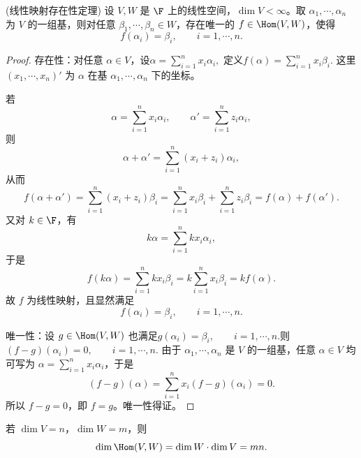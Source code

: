 \begin{theorem}(线性映射存在性定理)
	设 $V,W$ 是 $\F$ 上的线性空间，$\dim V<\infty$。取
	$\alpha_1,\cdots,\alpha_n$ 为 $V$ 的一组基，则对任意
	$\beta_1,\cdots,\beta_n\in W$，存在唯一的
	$f\in\Hom(V,W)$，使得
	\[
	f(\alpha_i)=\beta_i,
	\qquad i=1,\cdots,n.
	\]
\end{theorem}

\begin{proof}
	存在性：对任意 $\alpha\in V$，设$ \alpha=\sum\limits_{i=1}^{n}x_i\alpha_i,$
	定义$f(\alpha)=\sum\limits_{i=1}^{n}x_i\beta_i.$
	这里 $(x_1,\cdots,x_n)'$ 为 $\alpha$ 在基
	$\alpha_1,\cdots,\alpha_n$ 下的坐标。
	
	若
	\[
	\alpha=\sum_{i=1}^{n}x_i\alpha_i,
	\qquad
	\alpha'=\sum_{i=1}^{n}z_i\alpha_i,
	\]
	则
	\[
	\alpha+\alpha'=\sum_{i=1}^{n}(x_i+z_i)\alpha_i,
	\]
	从而
	\[
	f(\alpha+\alpha')
	=
	\sum_{i=1}^{n}(x_i+z_i)\beta_i
	=
	\sum_{i=1}^{n}x_i\beta_i+
	\sum_{i=1}^{n}z_i\beta_i
	=f(\alpha)+f(\alpha').
	\]
	又对 $k\in\F$，有
	\[
	k\alpha=\sum_{i=1}^{n}kx_i\alpha_i,
	\]
	于是
	\[
	f(k\alpha)=\sum_{i=1}^{n}kx_i\beta_i
	=k\sum_{i=1}^{n}x_i\beta_i
	=kf(\alpha).
	\]
	故 $f$ 为线性映射，且显然满足
	\[
	f(\alpha_i)=\beta_i,
	\qquad i=1,\cdots,n.
	\]
	
	唯一性：设 $g\in\Hom(V,W)$ 也满足$g(\alpha_i)=\beta_i,
	\qquad i=1,\cdots,n. $则$(f-g)(\alpha_i)=0,
	\qquad i=1,\cdots,n. $
	由于 $\alpha_1,\cdots,\alpha_n$ 是 $V$ 的一组基，任意
	$\alpha\in V$ 均可写为 $\alpha=\sum\limits_{i=1}^{n}x_i\alpha_i$，于是
	\[
	(f-g)(\alpha)
	=
	\sum_{i=1}^{n}x_i(f-g)(\alpha_i)=0.
	\]
	所以 $f-g=0$，即 $f=g$。唯一性得证。
\end{proof}

\begin{corollary}
	若 $\dim V=n$，$\dim W=m$，则
	\[
	\dim \Hom(V,W)=\dim W\cdot \dim V=mn.
	\]
\end{corollary}


